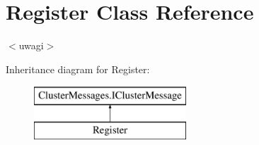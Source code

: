 \hypertarget{class_register}{}\section{Register Class Reference}
\label{class_register}


$<$uwagi$>$  


Inheritance diagram for Register\+:\begin{figure}[H]
\begin{center}
\leavevmode
\includegraphics[height=2.000000cm]{class_register}
\end{center}
\end{figure}
